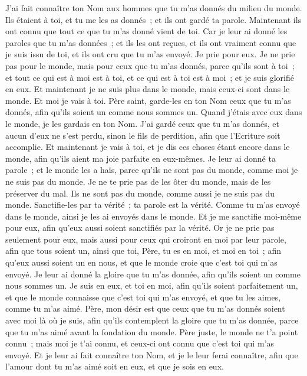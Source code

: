\begin{multicols}{2}
J'ai fait connaître ton Nom aux hommes que tu m'as donnés du milieu du monde. Ils étaient à toi, et tu me les as donnés~; et ils ont gardé ta parole.
Maintenant ils ont connu que tout ce que tu m'as donné vient de toi.
Car je leur ai donné les paroles que tu m'as données~; et ils les ont reçues, et ils ont vraiment connu que je suis issu de toi, et ils ont cru que tu m'as envoyé.
Je prie pour eux. Je ne prie pas pour le monde, mais pour ceux que tu m'as donnés, parce qu'ils sont à toi~;
et tout ce qui est à moi est à toi, et ce qui est à toi est à moi~; et je suis glorifié en eux.
Et maintenant je ne suis plus dans le monde, mais ceux-ci sont dans le monde. Et moi je vais à toi. Père saint, garde-les en ton Nom ceux que tu m'as donnés, afin qu'ils soient un comme nous sommes un.
Quand j'étais avec eux dans le monde, je les gardais en ton Nom. J'ai gardé ceux que tu m'as donnés, et aucun d'eux ne s'est perdu, sinon le fils de perdition, afin que l'Ecriture soit accomplie.
Et maintenant je vais à toi, et je dis ces choses étant encore dans le monde, afin qu'ils aient ma joie parfaite en eux-mêmes.
Je leur ai donné ta parole~; et le monde les a haïs, parce qu'ils ne sont pas du monde, comme moi je ne suis pas du monde.
Je ne te prie pas de les ôter du monde, mais de les préserver du mal.
Ils ne sont pas du monde, comme aussi je ne suis pas du monde.
Sanctifie-les par ta vérité~; ta parole est la vérité.
Comme tu m'as envoyé dans le monde, ainsi je les ai envoyés dans le monde.
Et je me sanctifie moi-même pour eux, afin qu'eux aussi soient sanctifiés par la vérité.
Or je ne prie pas seulement pour eux, mais aussi pour ceux qui croiront en moi par leur parole,
afin que tous soient un, ainsi que toi, Père, tu es en moi, et moi en toi~; afin qu'eux aussi soient un en nous, et que le monde croie que c'est toi qui m'as envoyé.
Je leur ai donné la gloire que tu m'as donnée, afin qu'ils soient un comme nous sommes un.
Je suis en eux, et toi en moi, afin qu'ils soient parfaitement un, et que le monde connaisse que c'est toi qui m'as envoyé, et que tu les aimes, comme tu m'as aimé.
Père, mon désir est que ceux que tu m'as donnés soient avec moi là où je suis, afin qu'ils contemplent la gloire que tu m'as donnée, parce que tu m'as aimé avant la fondation du monde.
Père juste, le monde ne t'a point connu~; mais moi je t'ai connu, et ceux-ci ont connu que c'est toi qui m'as envoyé.
Et je leur ai fait connaître ton Nom, et je le leur ferai connaître, afin que l'amour dont tu m'as aimé soit en eux, et que je sois en eux.

\end{multicols}
